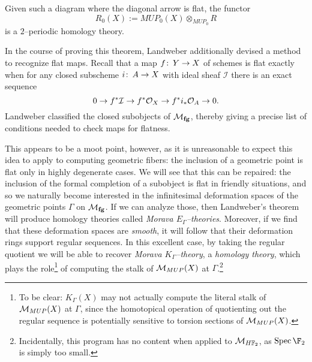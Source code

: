 \begin{theorem}[Landweber]\label{LandwebersStackyTheorem}
Given such a diagram where the diagonal arrow is flat, the functor \[R_0(X) := MUP_0(X) \otimes_{MUP_0} R\] is a $2$--periodic homology theory.
\end{theorem}

\noindent In the course of proving this theorem, Landweber additionally devised a method to recognize flat maps.  Recall that a map $f\colon\thinspace Y \to X$ of schemes is flat exactly when for any closed subscheme $i\colon\thinspace A \to X$ with ideal sheaf $\mathcal I$ there is an exact sequence \[0 \to f^* \mathcal{I} \to f^* \mathcal{O}_X \to f^* i_* \mathcal{O}_A \to 0.\]  Landweber classified the closed subobjects of $\mathcal{M}_{\mathbf{fg}}$, thereby giving a precise list of conditions needed to check maps for flatness.

This appears to be a moot point, however, as it is unreasonable to expect this idea to apply to computing geometric fibers: the inclusion of a geometric point is flat only in highly degenerate cases.  We will see that this can be repaired: the inclusion of the formal completion of a subobject is flat in friendly situations, and so we naturally become interested in the infinitesimal deformation spaces of the geometric points $\Gamma$ on $\mathcal{M}_{\mathbf{fg}}$.  If we can analyze those, then Landweber's theorem will produce homology theories called \textit{Morava $E_\Gamma$--theories}.  Moreover, if we find that these deformation spaces are \emph{smooth}, it will follow that their deformation rings support regular sequences.  In this excellent case, by taking the regular quotient we will be able to recover \textit{Morava $K_\Gamma$--theory}, a \emph{homology theory}, which plays the role\footnote{To be clear: $K_\Gamma(X)$ may not actually compute the literal stalk of $\mathcal{M}_{MUP}(X)$ at $\Gamma$, since the homotopical operation of quotienting out the regular sequence is potentially sensitive to torsion sections of $\mathcal{M}_{MUP}(X)$.} of computing the stalk of $\mathcal{M}_{MUP}(X)$ at $\Gamma$.\footnote{Incidentally, this program has no content when applied to $\context{\HFtwo}$, as $\Spec \F_2$ is simply too small.}

